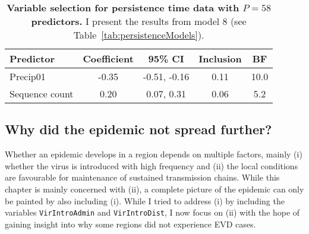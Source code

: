 \begin{minipage}{\textwidth}    
\setcounter{mpfootnote}{\value{footnote}}
\renewcommand{\thempfootnote}{\arabic{mpfootnote}}
\fontsize{9}{11}\selectfont
{}
\begin{longtable}{lcccc}
\caption[Variable selection for persistence time data with $P = 58$ predictors.]{\textbf{Variable selection for persistence time data with $P = 58$ predictors.}
I present the results from model 8 (see Table~\ref{tab:persistenceModels}).}
\label{tab:persistence_bigP_results}\\
\toprule
Predictor\footnotemark[1] & Coefficient\footnotemark[2] & 95\% CI\footnotemark[3] & Inclusion\footnotemark[4] & BF\footnotemark[5] \\
\toprule
Precip01 & -0.35 & -0.51, -0.16 & 0.11 & 10.0 \\
\hline
Sequence count & 0.20 & 0.07, 0.31 & 0.06 & 5.2\\
\bottomrule
\end{longtable}
\setcounter{footnote}{\value{mpfootnote}}
\end{minipage}

\subsection*{Why did the epidemic not spread further?}

Whether an epidemic develops in a region depends on multiple factors, mainly (i) whether the virus is introduced with high frequency and (ii) the local conditions are favourable for maintenance of sustained transmission chains.
While this chapter is mainly concerned with (ii), a complete picture of the epidemic can only be painted by also including (i).
While I tried to address (i) by including the variables \verb|VirIntroAdmin| and \verb|VirIntroDist|, I now focus on (ii) with the hope of gaining insight into why some regions did not experience EVD cases.

